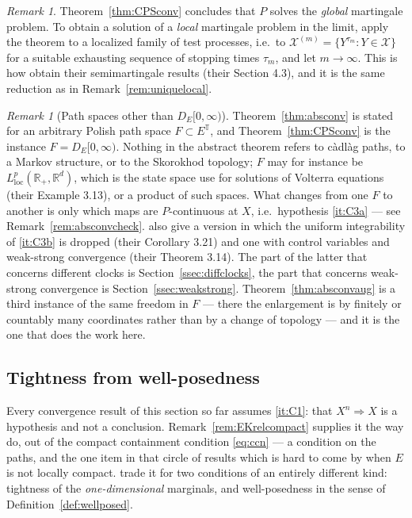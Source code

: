 \documentclass[11pt,a4paper]{article}
\theoremstyle{plain}
\theoremstyle{definition}
\theoremstyle{remark}
\newtheorem{remark}[theorem]{Remark}
\newcommand{\R}{\mathbb{R}}
\newcommand{\Rp}{\R_+}
\newcommand{\T}{\mathbb{T}}                     %
\newcommand{\DE}{D_E[0,\infty)}
\newcommand{\XX}{\mathcal{X}}                  %
\DeclareMathOperator*{\wto}{\Rightarrow}
\newcommand{\EK}{\cite{EK86}}
\newcommand{\CPS}{\cite{CPS23}}
\newcommand{\BK}{\cite{BK93}}
\begin{document}
\begin{remark}
  \label{rem:convlocal}
  Theorem~\ref{thm:CPSconv} concludes that $P$ solves the \emph{global}
  martingale problem.  To obtain a solution of a \emph{local} martingale problem
  in the limit, apply the theorem to a localized family of test processes, i.e.\
  to $\XX^{(m)} = \{ Y^{\tau_m} : Y \in \XX \}$ for a suitable exhausting
  sequence of stopping times $\tau_m$, and let $m \to \infty$.  This is how
  \CPS{} obtain their semimartingale results (their Section 4.3), and it is the
  same reduction as in Remark~\ref{rem:uniquelocal}.
\end{remark}

\begin{remark}[Path spaces other than $\DE$]
  \label{rem:CPSabstract}
  Theorem~\ref{thm:absconv} is stated for an arbitrary Polish path space
  $F \subset E^{\T}$, and Theorem~\ref{thm:CPSconv} is the instance $F = \DE$.
  Nothing in the abstract theorem refers to c\`adl\`ag paths, to a Markov
  structure, or to the Skorokhod topology; $F$ may for instance be
  $L^p_{\mathrm{loc}}(\Rp,\R^d)$, which is the state space \CPS{} use for
  solutions of Volterra equations (their Example 3.13), or a product of such
  spaces.  What changes from one $F$ to another is only which maps are
  $P$-continuous at $X$, i.e.\ hypothesis \ref{it:C3a} --- see
  Remark~\ref{rem:absconvcheck}.  \CPS{} also give a version in which the
  uniform integrability of \ref{it:C3b} is dropped (their Corollary 3.21) and one
  with control variables and weak-strong convergence (their Theorem 3.14).  The
  part of the latter that concerns different clocks is
  Section~\ref{ssec:diffclocks}, the part that concerns weak-strong convergence is
  Section~\ref{ssec:weakstrong}.  Theorem~\ref{thm:absconvaug} is a third
  instance of the same freedom in $F$ --- there the enlargement is by finitely or
  countably many coordinates rather than by a change of topology --- and it is the
  one that does the work here.
\end{remark}

\subsection{Tightness from well-posedness}
\label{ssec:BKtight}

Every convergence result of this section so far assumes \ref{it:C1}: that
$X^n \wto X$ is a hypothesis and not a conclusion.  Remark~\ref{rem:EKrelcompact}
supplies it the way \EK{} do, out of the compact containment condition
\eqref{eq:ccn} --- a condition on the paths, and the one item in that circle of
results which is hard to come by when $E$ is not locally compact.  \BK{} trade it
for two conditions of an entirely different kind: tightness of the
\emph{one-dimensional} marginals, and well-posedness in the sense of
Definition~\ref{def:wellposed}.
\end{document}
